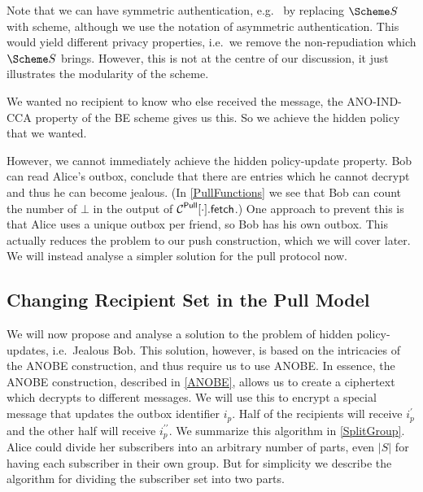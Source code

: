 Note that we can have symmetric authentication, e.g.\  by replacing 
\(\S\) with  scheme, although we use the notation of asymmetric 
authentication.
This would yield different privacy properties, i.e.\ we remove the 
non-repudiation which \(\S\) brings.
However, this is not at the centre of our discussion, it just illustrates the 
modularity of the scheme.

We wanted no recipient to know who else received the message, the ANO-IND-CCA 
property of the \ac{BE} scheme gives us this.
So we achieve the hidden policy that we wanted.

However, we cannot immediately achieve the hidden policy-update property.
Bob can read Alice's outbox, conclude that there are entries which he cannot 
decrypt and thus he can become jealous.
(In \cref{PullFunctions} we see that Bob can count the number of \(\bot\) in 
the output of \(\pget{\cdot}\).)
One approach to prevent this is that Alice uses a unique outbox per friend, so 
Bob has his own outbox.
This actually reduces the problem to our push construction, which we will cover 
later.
We will instead analyse a simpler solution for the pull protocol now.

\subsection{Changing Recipient Set in the Pull Model}
\label{ChangingPullRecipientSet}

We will now propose and analyse a solution to the problem of hidden 
policy-updates, i.e.\ Jealous Bob.
This solution, however, is based on the intricacies of the \ac{ANOBE} 
construction, and thus require us to use \ac{ANOBE}.
In essence, the \ac{ANOBE} construction, described in \cref{ANOBE}, allows us 
to create a ciphertext which decrypts to different messages.
We will use this to encrypt a special message that updates the outbox 
identifier \(i_p\).
Half of the recipients will receive \(i_p^\prime\) and the other half will 
receive \(i_p^{\prime\prime}\).
We summarize this algorithm in \cref{SplitGroup}.
Alice could divide her subscribers into an arbitrary number of parts, even 
\(|S|\) for having each subscriber in their own group.
But for simplicity we describe the algorithm for dividing the subscriber set 
into two parts.

